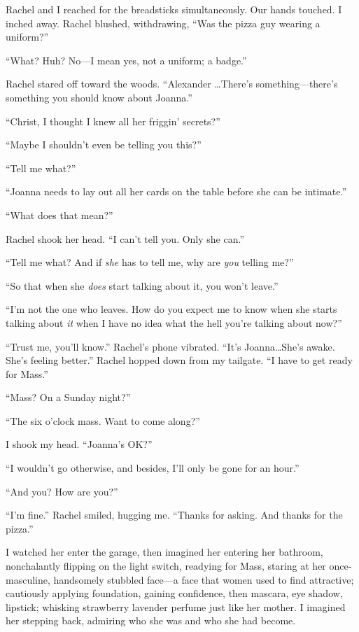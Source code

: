 Rachel and I reached for the breadsticks simultaneously. Our hands
touched. I inched away. Rachel blushed, withdrawing, ``Was the pizza guy
wearing a uniform?''

``What? Huh? No---I mean yes, not a uniform; a badge.''

Rachel stared off toward the woods. ``Alexander \ldots There's
some\-thing---there's something you should know about Joanna.''

``Christ, I thought I knew all her friggin' secrets?''

``Maybe I shouldn't even be telling you this?''

``Tell me what?''

``Joanna needs to lay out all her cards on the table before she can be
intimate.''

``What does that mean?''

Rachel shook her head. ``I can't tell you. Only she can.''

``Tell me what? And if \emph{she} has to tell me, why are \emph{you}
telling me?''

``So that when she \emph{does} start talking about it, you won't
leave.''

``I'm not the one who leaves. How do you expect me to know when she
starts talking about \emph{it} when I have no idea what the hell you're
talking about now?''

``Trust me, you'll know.'' Rachel's phone vibrated. ``It's
Joanna\ldots \linebreak She's awake. She's feeling better.'' Rachel hopped down
from my tailgate. ``I have to get ready for Mass.''

``Mass? On a Sunday night?''

``The six o'clock mass. Want to come along?''

I shook my head. ``Joanna's OK?''

``I wouldn't go otherwise, and besides, I'll only be gone for an hour.''

``And you? How are you?''

``I'm fine.'' Rachel smiled, hugging me. ``Thanks for asking. And thanks
for the pizza.''

I watched her enter the garage, then imagined her entering her bathroom,
nonchalantly flipping on the light switch, readying for Mass, staring at
her once-masculine, handsomely stubbled face---a face that women used to
find attractive; cautiously applying foundation, gaining confidence,
then mascara, eye shadow, lipstick; whisking strawberry lavender perfume
just like her mother. I imagined her stepping back, admiring who she was
and who she had become.

